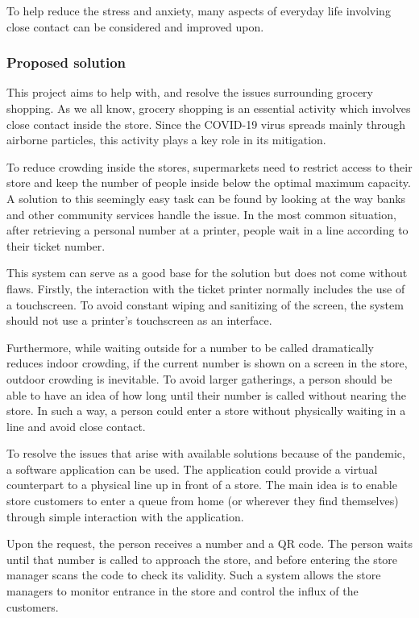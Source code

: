 To help reduce the stress and anxiety, many aspects of everyday life involving close contact can be considered and improved upon. 

\subsubsection{Proposed solution}
\hspace{\parindent}This project aims to help with, and resolve the issues surrounding grocery shopping. As we all know, grocery shopping is an essential activity which involves close contact inside the store. Since the COVID-19 virus spreads mainly through airborne particles, this activity plays a key role in its mitigation. 

To reduce crowding inside the stores, supermarkets need to restrict access to their store and keep the number of people inside below the optimal maximum capacity. A solution to this seemingly easy task can be found by looking at the way banks and other community services handle the issue. In the most common situation, after retrieving a personal number at a printer, people wait in a line according to their ticket number. 

This system can serve as a good base for the solution but does not come without flaws. Firstly, the interaction with the ticket printer normally includes the use of a touchscreen. To avoid constant wiping and sanitizing of the screen, the system should not use a printer's touchscreen as an interface. 

Furthermore, while waiting outside for a number to be called dramatically reduces indoor crowding, if the current number is shown on a screen in the store, outdoor crowding is inevitable. To avoid larger gatherings, a person should be able to have an idea of how long until their number is called without nearing the store. In such a way, a person could enter a store without physically waiting in a line and avoid close contact.

To resolve the issues that arise with available solutions
because of the pandemic, a software application can be used. The application could provide a virtual counterpart to a physical line up in front of a store. The main idea is to enable store customers to enter a queue from home (or wherever they find themselves) through simple interaction with the application.

Upon the request, the person receives a number and a QR code. The person waits until that number is called to approach the store, and before entering the store manager scans the code to check its validity. Such a system allows the store managers to monitor entrance in the store and control the influx of the customers. 

